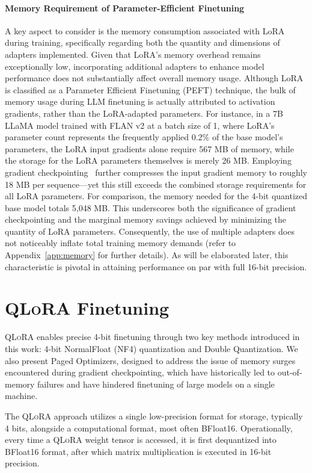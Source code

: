 \paragraph{Memory Requirement of Parameter-Efficient Finetuning} A key aspect to consider is the memory consumption associated with LoRA during training, specifically regarding both the quantity and dimensions of adapters implemented. Given that LoRA’s memory overhead remains exceptionally low, incorporating additional adapters to enhance model performance does not substantially affect overall memory usage. Although LoRA is classified as a Parameter Efficient Finetuning (PEFT) technique, the bulk of memory usage during LLM finetuning is actually attributed to activation gradients, rather than the LoRA-adapted parameters. For instance, in a 7B LLaMA model trained with FLAN v2 at a batch size of 1, where LoRA’s parameter count represents the frequently applied 0.2\% of the base model’s parameters\citep{hu2021lora,liu2022few}, the LoRA input gradients alone require 567 MB of memory, while the storage for the LoRA parameters themselves is merely 26 MB. Employing gradient checkpointing~\citep{chen2016training} further compresses the input gradient memory to roughly 18 MB per sequence—yet this still exceeds the combined storage requirements for all LoRA parameters. For comparison, the memory needed for the 4-bit quantized base model totals 5,048 MB. This underscores both the significance of gradient checkpointing and the marginal memory savings achieved by minimizing the quantity of LoRA parameters. Consequently, the use of multiple adapters does not noticeably inflate total training memory demands (refer to Appendix~\ref{app:memory} for further details). As will be elaborated later, this characteristic is pivotal in attaining performance on par with full 16-bit precision.

\section{\textsc{QLoRA} Finetuning}

\textsc{QLoRA} enables precise 4-bit finetuning through two key methods introduced in this work: 4-bit NormalFloat (NF4) quantization and Double Quantization. We also present Paged Optimizers, designed to address the issue of memory surges encountered during gradient checkpointing, which have historically led to out-of-memory failures and have hindered finetuning of large models on a single machine.

The \textsc{QLoRA} approach utilizes a single low-precision format for storage, typically 4 bits, alongside a computational format, most often BFloat16. Operationally, every time a \textsc{QLoRA} weight tensor is accessed, it is first dequantized into BFloat16 format, after which matrix multiplication is executed in 16-bit precision.

